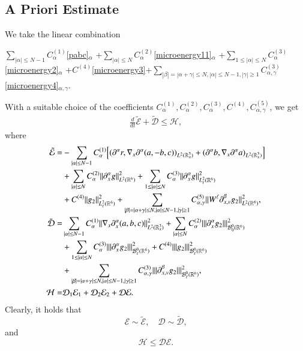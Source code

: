 \documentclass{amsart}[12pt, article]
\begin{document}
\subsection{A Priori Estimate}
\setcounter{equation}{0}
We take the linear combination
\begin{center}
$\displaystyle
\sum_{|\alpha|\le N-1}C^{(1)}_\alpha$\eqref{pabc}$_\alpha$
+$\displaystyle
\sum_{|\alpha|\le N}C^{(2)}_\alpha$\eqref{microenergy11}$_\alpha$
+$\displaystyle
\sum_{1\le|\alpha|\le N}C^{(3)}_\alpha$\eqref{microenergy2}$_\alpha$
+$C^{(4)}$\eqref{microenergy3}+$\displaystyle
\sum_{|\beta|=|\alpha+\gamma|\le N, |\alpha|\le N-1,
|\gamma|\ge 1}C^{(3)}_{\alpha, \gamma}$\eqref{microenergy4}$_{\alpha, \gamma}.$
\end{center}
With a suitable choice of the coefficients
$C^{(1)}_\alpha, C^{(2)}_\alpha,
C^{(3)}_\alpha, C^{(4)}, C^{(5)}_{\alpha, \gamma}$, we get
\begin{align}\label{energyinq1}
\frac{d}{dt}\tilde{\mathcal{E}}+\tilde{\mathcal{D}}\le \mathcal{H},
\end{align}
where
\begin{align*}
\tilde{\mathcal{E}}=&
-\sum_{|\alpha|\le N-1}C^{(1)}_\alpha
\Big[({{\partial}}^\alpha r,\nabla_x{{\partial}}^\alpha(a,-b,c))_{L^2({{{\mathbb R}}}^3_x)}
+({{\partial}}^\alpha b, \nabla_x {{\partial}}^\alpha a)_{L^2({{{\mathbb R}}}^3_x)}\Big]
\\&+\notag
\sum_{|\alpha|\le N}C^{(2)}_\alpha\|{{\partial}}^\alpha_x g\|^2_{L^2({{{\mathbb R}}}^6)}
+\sum_{1\le|\alpha|\le N}C^{(3)}_\alpha\|{{\partial}}^\alpha_x g\|^2_{L^2_\ell({{{\mathbb R}}}^6)}
\\&+\notag
C^{(4)}\|g_2\|^2_{L^2_\ell({{{\mathbb R}}}^6)}
+\sum_{|\beta|=|\alpha+\gamma|\le N, |\alpha|\le N-1,
|\gamma|\ge 1}C^{(5)}_{\alpha, \gamma}\|W^\ell{{\partial}}^\beta_{x,v} g_2\|^2_{L^2({{{\mathbb R}}}^6)},
\\
\tilde{\mathcal{D}}=&\sum_{|\alpha|\le N-1}C^{(1)}_\alpha\|\nabla_x {{\partial}}^\alpha_x (a,b,c)\|_{L^2({{{\mathbb R}}}^3_x)}^2
+\sum_{|\alpha|\le N}C^{(2)}_\alpha|||{{\partial}}^\alpha_x  g_2 |||_{{{\mathcal B}}^{0}_0({{{\mathbb R}}}^6)}^2
\\&+\notag
\sum_{1\le |\alpha|\le N}C^{(3)}_\alpha|||{{\partial}}^\alpha_x  g_2 |||_{{{\mathcal B}}^{0}_\ell({{{\mathbb R}}}^6)}^2
+C^{(4)}|||g_2|||^2_{{{\mathcal B}}^{0}_\ell({{{\mathbb R}}}^6)}
\\&+\sum_{|\beta|=|\alpha+\gamma|\le N, |\alpha|\le N-1,
|\gamma|\ge 1}C^{(3)}_{\alpha, \gamma}\notag
||| {{\partial}}^\beta_{x,v} g_2 |||^2_{{{\mathcal B}}^{0}_\ell({{{\mathbb R}}}^6)},
\\    \mathcal{H}=&\mathcal{D}_1\mathcal{E}_1
+\mathcal{D}_2\mathcal{E}_2+\mathcal{D}\mathcal{E}.
\end{align*}
Clearly, it holds that
\[
\mathcal{E}\sim \tilde{\mathcal{E}},
\quad
\mathcal{D}\sim \tilde{\mathcal{D}},
\]
and
\[
 \mathcal{H}
\le \mathcal{D}\mathcal{E}.
\]
\end{document}
